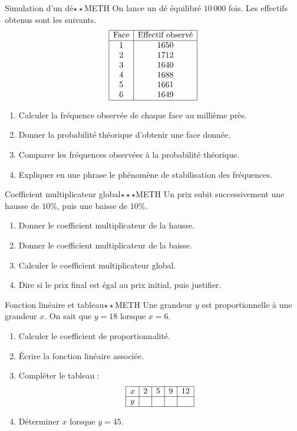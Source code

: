 \documentclass[11pt,a4paper]{article}
\newcounter{exo}
\begin{document}
\begin{exobox}{Simulation d'un dé}{$\star\star$}{METH}
On lance un dé équilibré $10\,000$ fois. Les effectifs obtenus sont les suivants.
\[
\begin{array}{|c|c|}
\hline
\text{Face} & \text{Effectif observé} \\
\hline
1 & 1650 \\
2 & 1712 \\
3 & 1640 \\
4 & 1688 \\
5 & 1661 \\
6 & 1649 \\
\hline
\end{array}
\]
\begin{enumerate}
\item Calculer la fréquence observée de chaque face au millième près.
\item Donner la probabilité théorique d'obtenir une face donnée.
\item Comparer les fréquences observées à la probabilité théorique.
\item Expliquer en une phrase le phénomène de stabilisation des fréquences.
\end{enumerate}
\end{exobox}

\begin{exobox}{Coefficient multiplicateur global}{$\star\star\star$}{METH}
Un prix subit successivement une hausse de $10\%$, puis une baisse de $10\%$.
\begin{enumerate}
\item Donner le coefficient multiplicateur de la hausse.
\item Donner le coefficient multiplicateur de la baisse.
\item Calculer le coefficient multiplicateur global.
\item Dire si le prix final est égal au prix initial, puis justifier.
\end{enumerate}
\end{exobox}

\begin{exobox}{Fonction linéaire et tableau}{$\star\star$}{METH}
Une grandeur $y$ est proportionnelle à une grandeur $x$. On sait que $y=18$ lorsque $x=6$.
\begin{enumerate}
\item Calculer le coefficient de proportionnalité.
\item Écrire la fonction linéaire associée.
\item Compléter le tableau :
\[
\begin{array}{|c|c|c|c|c|}
\hline
x & 2 & 5 & 9 & 12 \\
\hline
y & & & & \\
\hline
\end{array}
\]
\item Déterminer $x$ lorsque $y=45$.
\end{enumerate}
\end{exobox}
\end{document}
